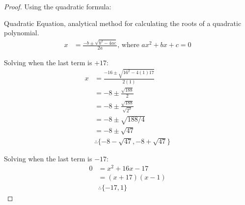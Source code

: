 \begin{question}
\begin{proof}
    Using the quadratic formula:
    \begin{definition}{Quadratic Equation}, analytical method for calculating the roots of a quadratic polynomial.
      \begin{equation}
        \begin{split}
          x & = \frac{-b \pm{\sqrt{b^2 - 4ac}}}{2a} \text{, where } ax^2 + bx + c = 0
        \end{split}
      \end{equation}
    \end{definition}
    
    Solving when the last term is $+17$:
    \begin{equation}
      \begin{split}
        x & = \frac{-16 \pm{\sqrt{16^2 - 4(1)17}}}{2(1)} \\
        & = -8 \pm{\frac{\sqrt{188}}{2}} \\
        & = -8 \pm{\frac{\sqrt{188}}{\sqrt{2^2}}} \\
        & = -8 \pm{\sqrt{188/4}} \\
        & = -8 \pm{\sqrt{47}} \\
        & \therefore \{-8 - \sqrt{47}, -8 + \sqrt{47}\}
      \end{split}
    \end{equation}

    Solving when the last term is $-17$:
    \begin{equation}
      \begin{split}
        0 & = x^2 + 16x - 17 \\
        & = (x + 17)(x - 1) \\
        & \therefore \{-17, 1\}
      \end{split}
    \end{equation}
    
  \end{proof}
\end{question}

